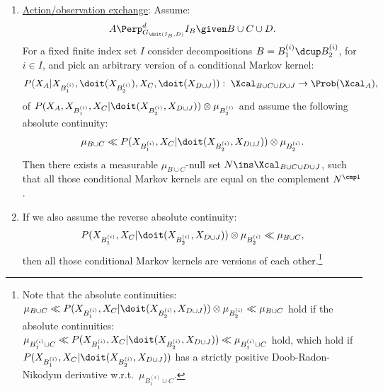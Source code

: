 \begin{Cor}
\begin{enumerate}
\item \underline{Action/observation exchange}: Assume:
            \[ A \Perp^d_{G_{\doit(I_B,D)}} I_B \given B \cup C \cup D.   \]
            For a fixed finite index set $I$ consider decompositions
            $B=B_1^{(i)} \dcup B_2^{(i)}$, for $i \in I$,
            and pick an arbitrary version of a conditional Markov kernel:
            \[ P(X_A|X_{B_1^{(i)}},\doit(X_{B_2^{(i)}}),X_C,\doit(X_{D\cup J})): 
            \;\Xcal_{B \cup C \cup D \cup J} \to \Prob(\Xcal_A), \]
            of $P(X_A,X_{B_1^{(i)}},X_C|\doit(X_{B_2^{(i)}},X_{D\cup J})) \otimes \mu_{B_2^{(i)}}$ 
            and assume the following absolute continuity:
            \[ \mu_{B \cup C} \ll  P(X_{B_1^{(i)}},X_C|\doit(X_{B_2^{(i)}},X_{D\cup J})) \otimes \mu_{B_2^{(i)}}. \]
        Then there exists a measurable $\mu_{B \cup C}$-null set
        $N \ins \Xcal_{B \cup C \cup D \cup J}$,
        such that all those conditional Markov kernels are equal on the complement $N^\cmpl$.
    \item[] If we also assume the reverse absolute continuity:
         \[  P(X_{B_1^{(i)}},X_C|\doit(X_{B_2^{(i)}},X_{D\cup J})) \otimes \mu_{B_2^{(i)}} \ll \mu_{B \cup C}, \]
         then all those conditional Markov kernels are versions of each other.\footnote{Note that the absolute continuities: $ \mu_{B \cup C} \ll P(X_{B_1^{(i)}},X_C|\doit(X_{B_2^{(i)}},X_{D\cup J})) \otimes \mu_{B_2^{(i)}} \ll \mu_{B \cup C} $ hold if the absolute continuities: $\mu_{B_1^{(i)} \cup C} \ll P(X_{B_1^{(i)}},X_C|\doit(X_{B_2^{(i)}},X_{D\cup J})) \ll \mu_{B_1^{(i)} \cup C} $ hold, which hold if $P(X_{B_1^{(i)}},X_C|\doit(X_{B_2^{(i)}},X_{D\cup J}))$ has a strictly positive Doob-Radon-Nikodym derivative w.r.t.\ $\mu_{B_1^{(i)} \cup C}$.}


\end{enumerate}
\end{Cor}
